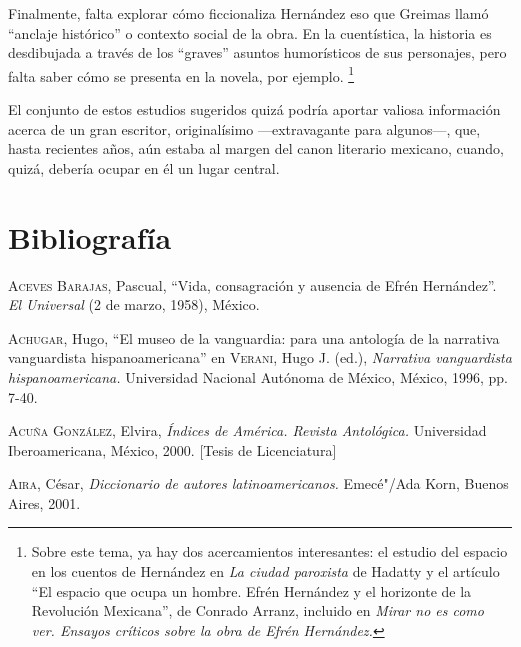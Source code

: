 \documentclass[14pt,twoside,final]{extbook} %
\let\oldfootnote\footnote
\renewcommand\footnote[1]{%
\oldfootnote{\hspace{1mm}#1}}
\begin{document}
Finalmente, falta explorar cómo ficcionaliza Hernández eso que Greimas llamó ``anclaje histórico'' o contexto social de la obra. En la cuentística, la historia es desdibujada a través de los ``graves'' asuntos humorísticos de sus personajes, pero falta saber cómo se presenta en la novela, por ejemplo.\footnote{Sobre este tema, ya hay dos acercamientos interesantes: el estudio del espacio en los cuentos de Hernández en \emph{La ciudad paroxista} de Hadatty y el artículo ``El espacio que ocupa un hombre. Efrén Hernández y el horizonte de la Revolución Mexicana'', de Conrado Arranz, incluido en \emph{Mirar no es como ver. Ensayos críticos sobre la obra de Efrén Hernández.}}

El conjunto de estos estudios sugeridos quizá podría aportar valiosa información acerca de un gran escritor, originalísimo ---extravagante para algunos---, que, hasta recientes años, aún estaba al margen del canon literario mexicano, cuando, quizá, debería ocupar en él un lugar central.
\chapter[\textsc{Bibliografía}]{Bibliografía}\label{ch:bibliografia}
\thispagestyle{empty}
\pagestyle{fancy}
\fancyhf{} %
\fancyhead[RO,LE]{\thepage}
\renewcommand{\headrulewidth}{0pt}
\textsc{Aceves Barajas}, Pascual, ``Vida, consagración y ausencia de Efrén Hernández''. \emph{El Universal} (2 de marzo, 1958), México.\label{bib:aceves1958}

\textsc{Achugar}, Hugo, ``El museo de la vanguardia: para una antología de la narrativa vanguardista hispanoamericana'' en \textsc{Verani}, Hugo J. (ed.), \emph{Narrativa vanguardista hispanoamericana.} Universidad Nacional Autónoma de México, México, 1996, pp. 7-40.\label{bib:achugar1996}

\textsc{Acuña González}, Elvira, \emph{Índices de \emph{América. Revista Antológica}.} Universidad Iberoamericana, México, 2000. [Tesis de Licenciatura]\label{bib:acuña2000}

\textsc{Aira}, César, \emph{Diccionario de autores latinoamericanos.} Emecé"/Ada Korn, Buenos Aires, 2001.\label{bib:aira2001}
\end{document}

